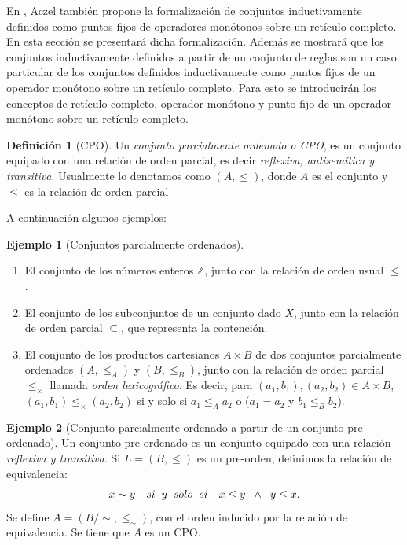 \documentclass[11pt,oneside]{report}
\theoremstyle{plain}
\theoremstyle{definition}
\newtheorem{defi}{Definición}[chapter]
\newtheorem{ejemplo}{Ejemplo}[chapter]
\newcommand{\Z}{\mathbb{Z}}
\begin{document}
En \cite{Aczel}, Aczel también propone la formalización de conjuntos inductivamente definidos como puntos fijos de operadores monótonos sobre un retículo completo. En esta sección se presentará dicha formalización. Además se mostrará que los conjuntos inductivamente definidos a partir de un conjunto de reglas son un caso particular de los conjuntos definidos inductivamente como puntos fijos de un operador monótono sobre un retículo completo. Para esto se introducirán los conceptos de retículo completo, operador monótono y punto fijo de un operador monótono sobre un retículo completo.

\begin{defi}[CPO]
    Un \emph{conjunto parcialmente ordenado o CPO}, es un conjunto equipado con una relación de orden parcial, es decir \emph{reflexiva, antisemítica y transitiva}. Usualmente lo denotamos como $(A,\leq)$, donde $A$ es el conjunto y $\leq$ es la relación de orden parcial
\end{defi}
A continuación algunos ejemplos:
\begin{ejemplo}[Conjuntos parcialmente ordenados]
    \begin{enumerate}
        \item El conjunto de los números enteros $\Z$, junto con la relación de orden usual $\leq$.
        \item El conjunto de los subconjuntos de un conjunto dado $X$, junto con la relación de orden parcial $\subseteq$, que representa la contención.
        \item El conjunto de los productos cartesianos $A \times B$ de dos conjuntos parcialmente ordenados $(A,\leq_A)$ y $(B,\leq_B)$, junto con la relación de orden parcial $\leq_{\times}$ llamada \emph{orden lexicográfico}. Es decir, para $(a_1,b_1),(a_2,b_2) \in A \times B$, $(a_1,b_1) \leq_{\times} (a_2,b_2)$ si y solo si $a_1 \leq_{A} a_2$ o ($a_1 = a_2$ y $b_1 \leq_{B} b_2$).
    \end{enumerate}
\end{ejemplo}
\begin{ejemplo}[Conjunto parcialmente ordenado a partir de un conjunto pre-ordenado]
    Un conjunto pre-ordenado es un conjunto equipado con una relación \emph{reflexiva y transitiva}. Si $L = (B, \leq)$ es un pre-orden, definimos la relación de equivalencia:
    $$x \sim y \quad si\hspace{2mm} y \hspace{2mm} solo \hspace{2mm} si \quad x \leq y \hspace{2mm} \land \hspace{2mm} y \leq x.$$
    Se define $A = (B/\sim , \leq_{\sim})$, con el orden inducido por la relación de equivalencia. Se tiene que $A$ es un CPO.
\end{ejemplo}
\end{document}
